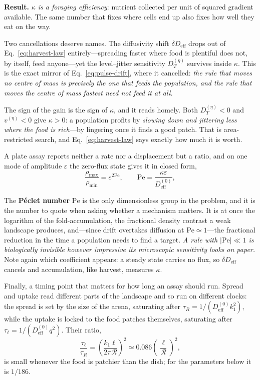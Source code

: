\documentclass[
  reprint,
  superscriptaddress,
  amsmath,
  amssymb,
  aps,
  pre,
  nofootinbib,
  floatfix
]{revtex4-2}
\begin{document}
\textbf{Result.}  \emph{$\kappa$ is a foraging efficiency}: nutrient collected
per unit of squared gradient available.  The same number that fixes where
cells end up also fixes how well they eat on the way.

Two cancellations deserve names.  The diffusivity shift
$\delta D_{\mathrm{eff}}$ drops out of Eq.~\eqref{eq:harvest-law}
entirely---spreading faster where food is plentiful does not, by itself, feed
anyone---yet the level--jitter sensitivity $D_T^{(\eta)}$ survives inside
$\kappa$.  This is the exact mirror of Eq.~\eqref{eq:pulse-drift}, where it
cancelled: \emph{the rule that moves no centre of mass is precisely the one
that feeds the population, and the rule that moves the centre of mass fastest
need not feed it at all.}

The sign of the gain is the sign of $\kappa$, and it reads homely.  Both
$D_T^{(\eta)}<0$ and $v^{(\eta)}<0$ give $\kappa>0$: a population profits by
\emph{slowing down and jittering less where the food is rich}---by lingering
once it finds a good patch.  That is area-restricted search, and
Eq.~\eqref{eq:harvest-law} says exactly how much it is worth.

A plate assay reports neither a rate nor a displacement but a ratio, and on
one mode of amplitude $\varepsilon$ the zero-flux state gives it in closed
form,
\begin{equation}
 \frac{\rho_{\max}}{\rho_{\min}}=e^{2\mathrm{Pe}},
 \qquad
 \mathrm{Pe}=\frac{\kappa\varepsilon}{D_{\mathrm{eff}}^{(0)}},
 \label{eq:accumulation-ratio}
\end{equation}

The \textbf{P\'eclet number} $\mathrm{Pe}$ is the only dimensionless group in
the problem, and it is the number to quote when asking whether a mechanism
matters.  It is at once the logarithm of the fold-accumulation, the fractional
density contrast a weak landscape produces, and---since drift overtakes
diffusion at $\mathrm{Pe}\simeq1$---the fractional reduction in the time a
population needs to find a target.  \emph{A rule with $|\mathrm{Pe}|\ll1$ is
biologically invisible however impressive its microscopic sensitivity looks on
paper.}  Note again which coefficient appears: a steady state carries no flux,
so $\delta D_{\mathrm{eff}}$ cancels and accumulation, like harvest, measures
$\kappa$.

Finally, a timing point that matters for how long an assay should run.  Spread
and uptake read different parts of the landscape and so run on different
clocks: the spread is set by the size of the arena, saturating after
$\tau_R=1/(D_{\mathrm{eff}}^{(0)}k_1^{2})$, while the uptake is locked to the
food patches themselves, saturating after
$\tau_\ell=1/(D_{\mathrm{eff}}^{(0)}q^{2})$.  Their ratio,
\begin{equation}
 \frac{\tau_\ell}{\tau_R}=\left(\frac{k_1\ell}{2\pi\mathcal R}\right)^{2}
 \simeq0.086\left(\frac{\ell}{\mathcal R}\right)^{2},
 \label{eq:two-clocks}
\end{equation}
is small whenever the food is patchier than the dish; for the parameters below
it is $1/186$.
\end{document}
